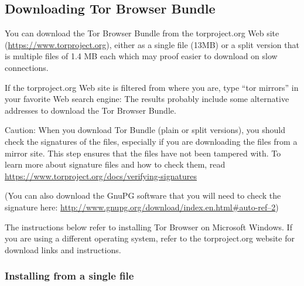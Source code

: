\subsection{Downloading Tor Browser Bundle}

You can download the Tor Browser Bundle from the torproject.org Web site
(\href{https://www.torproject.org}{https://www.torproject.org}), either
as a single file (13MB) or a split version that is multiple files of 1.4
MB each which may proof easier to download on slow connections.

If the torproject.org Web site is filtered from where you are, type
``tor mirrors'' in your favorite Web search engine: The results probably
include some alternative addresses to download the Tor Browser Bundle.

Caution: When you download Tor Bundle (plain or split versions), you
should check the signatures of the files, especially if you are
downloading the files from a mirror site. This step ensures that the
files have not been tampered with. To learn more about signature files
and how to check them, read
\href{https://www.torproject.org/docs/verifying-signatures}{https://www.torproject.org/docs/verifying-signatures}

(You can also download the GnuPG software that you will need to check
the signature here:
\href{http://www.gnupg.org/download/index.en.html\#auto-ref-2}{http://www.gnupg.org/download/index.en.html\#auto-ref--2})

The instructions below refer to installing Tor Browser on Microsoft
Windows. If you are using a different operating system, refer to the
torproject.org website for download links and instructions.

\subsubsection{Installing from a single file}

